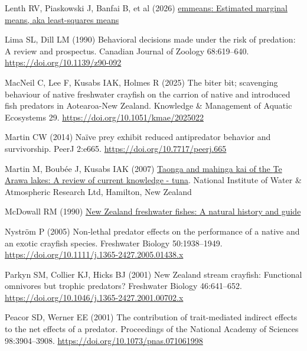 \documentclass[
  letterpaper,
  DIV=11,
  numbers=noendperiod]{scrartcl}
\newlength{\cslhangindent}
\newenvironment{CSLReferences}[2] %
 {\begin{list}{}{%
  \setlength{\itemindent}{0pt}
  \setlength{\leftmargin}{0pt}
  \setlength{\parsep}{0pt}
  \ifodd #1
   \setlength{\leftmargin}{\cslhangindent}
   \setlength{\itemindent}{-1\cslhangindent}
  \fi
  \setlength{\itemsep}{#2\baselineskip}}}
 {\end{list}}
\begin{document}
\begin{CSLReferences}{1}{1}
Lenth RV, Piaskowski J, Banfai B, et al (2026)
\href{https://cran.r-project.org/web/packages/emmeans/index.html}{{emmeans}:
Estimated marginal means, aka least-squares means}

Lima SL, Dill LM (1990) Behavioral decisions made under the risk of
predation: A review and prospectus. Canadian Journal of Zoology
68:619--640. \url{https://doi.org/10.1139/z90-092}

MacNeil C, Lee F, Kusabs IAK, Holmes R (2025) The biter bit; scavenging
behaviour of native freshwater crayfish on the carrion of native and
introduced fish predators in {Aotearoa-New Zealand}. Knowledge \&
Management of Aquatic Ecosystems 29.
\url{https://doi.org/10.1051/kmae/2025022}

Martin CW (2014) Naïve prey exhibit reduced antipredator behavior and
survivorship. PeerJ 2:e665. \url{https://doi.org/10.7717/peerj.665}

Martin M, Boubée J, Kusabs IAK (2007)
\href{https://niwa.co.nz/sites/default/files/2025-04/te_arawa_species_report_tuna_0.pdf}{Taonga
and mahinga kai of the {Te Arawa} lakes: A review of current knowledge -
tuna}. {National Institute of Water} \& {Atmospheric Research Ltd},
{Hamilton}, {New Zealand}

McDowall RM (1990)
\href{https://agris.fao.org/search/en/providers/122621/records/6473966cce9437aa76003d0e}{{New
Zealand} freshwater fishes: A natural history and guide}

Nyström P (2005) Non‐lethal predator effects on the performance of a
native and an exotic crayfish species. Freshwater Biology 50:1938--1949.
\url{https://doi.org/10.1111/j.1365-2427.2005.01438.x}

Parkyn SM, Collier KJ, Hicks BJ (2001) {New Zealand} stream crayfish:
Functional omnivores but trophic predators? Freshwater Biology
46:641--652. \url{https://doi.org/10.1046/j.1365-2427.2001.00702.x}

Peacor SD, Werner EE (2001) The contribution of trait-mediated indirect
effects to the net effects of a predator. Proceedings of the National
Academy of Sciences 98:3904--3908.
\url{https://doi.org/10.1073/pnas.071061998}


\end{CSLReferences}
\end{document}
